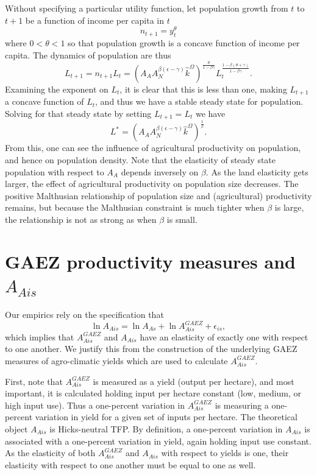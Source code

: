 \documentclass[11pt]{article}
\begin{document}
Without specifying a particular utility function, let population growth from $t$ to $t+1$ be a function of income per capita in $t$
\begin{equation}
    n_{t+1} = y_t^{\theta} \nonumber
\end{equation}
where $0<\theta<1$ so that population growth is a concave function of income per capita. The dynamics of population are thus
\begin{equation}
    L_{t+1} = n_{t+1} L_t = \left(A_A A_N^{\beta(\epsilon-\gamma)}\hat{k}^{\Omega}\right)^{\frac{\theta}{1-\beta\gamma}} L_t^{\frac{1-\beta(\theta+\gamma)}{1-\beta\gamma}}. \nonumber
\end{equation}
Examining the exponent on $L_t$, it is clear that this is less than one, making $L_{t+1}$ a concave function of $L_t$, and thus we have a stable steady state for population. Solving for that steady state by setting $L_{t+1} = L_t$ we have
\begin{equation}
    L^{\ast} = \left(A_A A_N^{\beta(\epsilon-\gamma)}\hat{k}^{\Omega}\right)^{\frac{1}{\beta}}. \nonumber
\end{equation}
From this, one can see the influence of agricultural productivity on population, and hence on population density. Note that the elasticity of steady state population with respect to $A_A$ depends inversely on $\beta$. As the land elasticity gets larger, the effect of agricultural productivity on population size decreases. The positive Malthusian relationship of population size and (agricultural) productivity remains, but because the Malthusian constraint is much tighter when $\beta$ is large, the relationship is not as strong as when $\beta$ is small. 

\section{GAEZ productivity measures and $A_{Ais}$}
Our empirics rely on the specification that
\begin{equation}
    \ln A_{Ais} = \ln A_{As} + \ln A^{GAEZ}_{Ais} + \epsilon_{is},
\end{equation}
which implies that $A^{GAEZ}_{Ais}$ and $A_{Ais}$ have an elasticity of exactly one with respect to one another. We justify this from the construction of the underlying GAEZ measures of agro-climatic yields which are used to calculate $A^{GAEZ}_{Ais}$. 

First, note that $A^{GAEZ}_{Ais}$ is measured as a yield (output per hectare), and most important, it is calculated holding input per hectare constant (low, medium, or high input use). Thus a one-percent variation in $A^{GAEZ}_{Ais}$ is measuring a one-percent variation in yield for a given set of inputs per hectare. The theoretical object $A_{Ais}$ is Hicks-neutral TFP. By definition, a one-percent variation in $A_{Ais}$ is associated with a one-percent variation in yield, again holding input use constant. As the elasticity of both $A^{GAEZ}_{Ais}$ and $A_{Ais}$ with respect to yields is one, their elasticity with respect to one another must be equal to one as well. 
\end{document}
